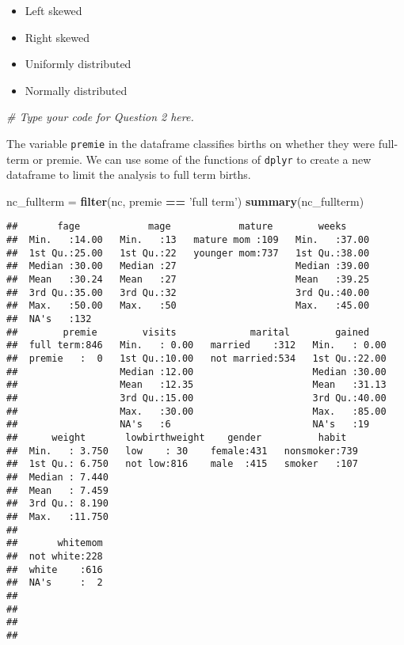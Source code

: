 \documentclass[]{article}
\newenvironment{Shaded}{\begin{snugshade}}{\end{snugshade}}
\newcommand{\KeywordTok}[1]{\textcolor[rgb]{0.13,0.29,0.53}{\textbf{#1}}}
\newcommand{\StringTok}[1]{\textcolor[rgb]{0.31,0.60,0.02}{#1}}
\newcommand{\CommentTok}[1]{\textcolor[rgb]{0.56,0.35,0.01}{\textit{#1}}}
\newcommand{\OperatorTok}[1]{\textcolor[rgb]{0.81,0.36,0.00}{\textbf{#1}}}
\newcommand{\NormalTok}[1]{#1}
\providecommand{\tightlist}{%
  \setlength{\itemsep}{0pt}\setlength{\parskip}{0pt}}
\begin{document}
\begin{itemize}
\tightlist
\item
  Left skewed
\item
  Right skewed
\item
  Uniformly distributed
\item
  Normally distributed
\end{itemize}

\begin{Shaded}
\begin{Highlighting}[]
\CommentTok{# Type your code for Question 2 here.}
\end{Highlighting}
\end{Shaded}

The variable \texttt{premie} in the dataframe classifies births on
whether they were full-term or premie. We can use some of the functions
of \texttt{dplyr} to create a new dataframe to limit the analysis to
full term births.

\begin{Shaded}
\begin{Highlighting}[]
\NormalTok{nc_fullterm =}\StringTok{ }\KeywordTok{filter}\NormalTok{(nc, premie }\OperatorTok{==}\StringTok{ 'full term'}\NormalTok{)}
\KeywordTok{summary}\NormalTok{(nc_fullterm)}
\end{Highlighting}
\end{Shaded}

\begin{verbatim}
##       fage            mage            mature        weeks      
##  Min.   :14.00   Min.   :13   mature mom :109   Min.   :37.00  
##  1st Qu.:25.00   1st Qu.:22   younger mom:737   1st Qu.:38.00  
##  Median :30.00   Median :27                     Median :39.00  
##  Mean   :30.24   Mean   :27                     Mean   :39.25  
##  3rd Qu.:35.00   3rd Qu.:32                     3rd Qu.:40.00  
##  Max.   :50.00   Max.   :50                     Max.   :45.00  
##  NA's   :132                                                   
##        premie        visits             marital        gained     
##  full term:846   Min.   : 0.00   married    :312   Min.   : 0.00  
##  premie   :  0   1st Qu.:10.00   not married:534   1st Qu.:22.00  
##                  Median :12.00                     Median :30.00  
##                  Mean   :12.35                     Mean   :31.13  
##                  3rd Qu.:15.00                     3rd Qu.:40.00  
##                  Max.   :30.00                     Max.   :85.00  
##                  NA's   :6                         NA's   :19     
##      weight       lowbirthweight    gender          habit    
##  Min.   : 3.750   low    : 30    female:431   nonsmoker:739  
##  1st Qu.: 6.750   not low:816    male  :415   smoker   :107  
##  Median : 7.440                                              
##  Mean   : 7.459                                              
##  3rd Qu.: 8.190                                              
##  Max.   :11.750                                              
##                                                              
##       whitemom  
##  not white:228  
##  white    :616  
##  NA's     :  2  
##                 
##                 
##                 
## 
\end{verbatim}
\end{document}
